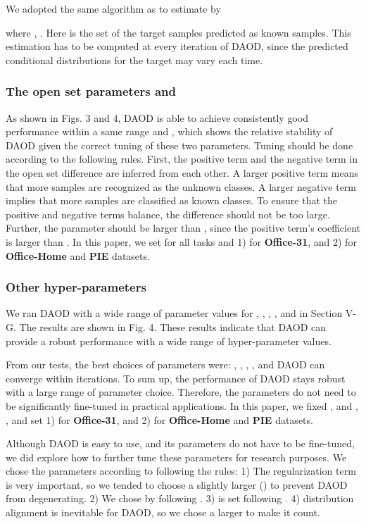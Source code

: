 \documentclass[journal]{IEEEtran}
\begin{document}
We adopted the same algorithm as \cite{DBLP:conf/mm/WangFCYHY18} to estimate  by

where , . Here  is the set of the target samples predicted as known samples. This estimation has to be computed at every iteration of DAOD, since the predicted conditional distributions for the target may
vary each time.
\subsubsection{{The open set parameters  and }}

As shown in Figs. 3 and 4, DAOD is able to achieve consistently good performance within a same range  and , which shows the relative stability of DAOD given the correct tuning of these two parameters.
Tuning should be done according to the following rules. First, the positive term   and the negative term  in the open set difference are inferred from each other. A larger positive term means that more samples are recognized as the unknown classes. A larger negative term implies that more samples are classified as known classes. To ensure that the positive and negative terms balance, the difference  should not be too large.  Further, the parameter  should be larger than , since the positive term's coefficient   is larger than . In this paper, we set  for all tasks and 1)  for \textbf{Office-31}, and 2)  for \textbf{Office-Home} and \textbf{PIE} datasets.

\subsubsection{{Other hyper-parameters}}
We ran DAOD with a wide range of parameter values for , , , ,  and  in Section V-G. The results are shown in Fig. 4. These results indicate that DAOD can provide a robust performance with a wide range of hyper-parameter values.

From our tests, the best choices of parameters were: , , , ,  and DAOD can converge within  iterations. To sum up, the performance of DAOD stays robust with a large range of parameter choice. Therefore, the parameters do not need to be significantly fine-tuned in practical applications.
In this paper, we fixed ,  and , ,  and set 1)  for \textbf{Office-31}, and 2)  for \textbf{Office-Home} and \textbf{PIE} datasets.

Although DAOD is easy to use, and its parameters do not have to be fine-tuned, we did explore how to further tune these parameters for research purposes. We chose the parameters according to following the rules: 1) The regularization term  is very important, so we tended to choose a slightly larger  () to prevent DAOD from degenerating. 2)  We chose  by following \cite{DBLP:journals/jmlr/BelkinNS06}. 3)  is set following \cite{DBLP:journals/jmlr/BelkinNS06,DBLP:journals/pami/CaiHHH11}. 4)  distribution alignment is inevitable for DAOD, so we chose a larger   to make it count. 
\end{document}
